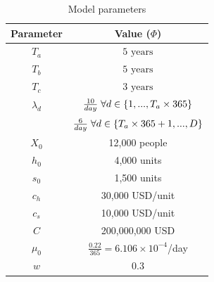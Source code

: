 \documentclass[12pt,a4paper]{article}
\begin{document}
\begin{table}
        \begin{center}
        \caption{Model parameters}
        \begin{tabular}{ |c|c| } 
         \hline
         \textbf{Parameter} & \textbf{Value ($\Phi$)}\\ 
         \hline
         $T_a$ & $5 \text{ years}$\\ 
         \hline
         $T_b$ & $5 \text{ years}$\\
         \hline
         $T_c$ & $3 \text{ years}$\\          
         \hline
         $\lambda_d$ & $\frac{10}{day} \hspace{0.1cm} \forall d \in \{1,...,T_a\times365\}$\\ 
          & $\frac{6}{day} \hspace{0.1cm} \forall d \in \{T_a\times365+1,...,D\}$\\          
         \hline           
         $X_0$ & 12,000 people\\         
         \hline
         $h_0$ & 4,000 units\\ 
         \hline
         $s_0$ & 1,500 units\\ 
         \hline      
         $c_h$ & 30,000 USD/unit\\ 
         \hline
         $c_s$ & 10,000 USD/unit\\ 
         \hline         
         $C$ & 200,000,000 USD\\ 
         \hline  
         $\mu_0$ & $\frac{0.22}{365} = 6.106 \times 10^{-4}$/day \\ 
         \hline
         $w$ & $0.3$\\ 
         \hline
        \end{tabular}
        \label{tab:model_params}
        \end{center}
        \end{table}
\end{document}

